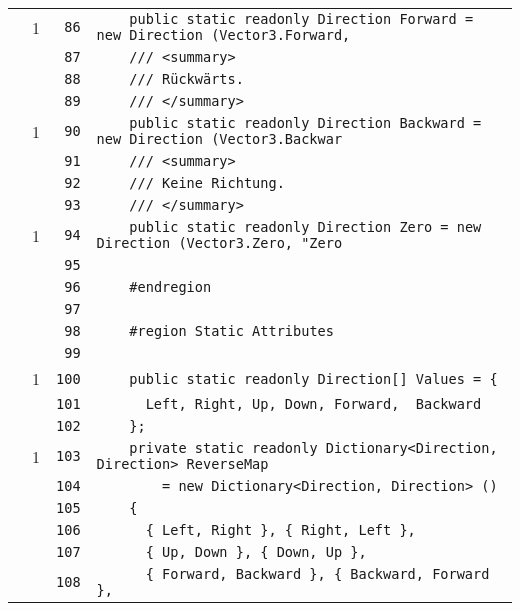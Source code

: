 \documentclass[a4paper,10pt]{article}
\begin{document}
\begin{longtable}[l]{lrrl}
\cellcolor{green} & 1 & \verb~86~ & \verb~    public static readonly Direction Forward = new Direction (Vector3.Forward,~\\
\cellcolor{gray} &  & \verb~87~ & \verb~    /// <summary>~\\
\cellcolor{gray} &  & \verb~88~ & \verb~    /// Rückwärts.~\\
\cellcolor{gray} &  & \verb~89~ & \verb~    /// </summary>~\\
\cellcolor{green} & 1 & \verb~90~ & \verb~    public static readonly Direction Backward = new Direction (Vector3.Backwar~\\
\cellcolor{gray} &  & \verb~91~ & \verb~    /// <summary>~\\
\cellcolor{gray} &  & \verb~92~ & \verb~    /// Keine Richtung.~\\
\cellcolor{gray} &  & \verb~93~ & \verb~    /// </summary>~\\
\cellcolor{green} & 1 & \verb~94~ & \verb~    public static readonly Direction Zero = new Direction (Vector3.Zero, "Zero~\\
\cellcolor{gray} &  & \verb~95~ & \verb~~\\
\cellcolor{gray} &  & \verb~96~ & \verb~    #endregion~\\
\cellcolor{gray} &  & \verb~97~ & \verb~~\\
\cellcolor{gray} &  & \verb~98~ & \verb~    #region Static Attributes~\\
\cellcolor{gray} &  & \verb~99~ & \verb~~\\
\cellcolor{green} & 1 & \verb~100~ & \verb~    public static readonly Direction[] Values = {~\\
\cellcolor{gray} &  & \verb~101~ & \verb~      Left, Right, Up, Down, Forward,  Backward~\\
\cellcolor{gray} &  & \verb~102~ & \verb~    };~\\
\cellcolor{green} & 1 & \verb~103~ & \verb~    private static readonly Dictionary<Direction, Direction> ReverseMap~\\
\cellcolor{gray} &  & \verb~104~ & \verb~        = new Dictionary<Direction, Direction> ()~\\
\cellcolor{gray} &  & \verb~105~ & \verb~    {~\\
\cellcolor{gray} &  & \verb~106~ & \verb~      { Left, Right }, { Right, Left },~\\
\cellcolor{gray} &  & \verb~107~ & \verb~      { Up, Down }, { Down, Up },~\\
\cellcolor{gray} &  & \verb~108~ & \verb~      { Forward, Backward }, { Backward, Forward },~\\

\end{longtable}
\end{document}
